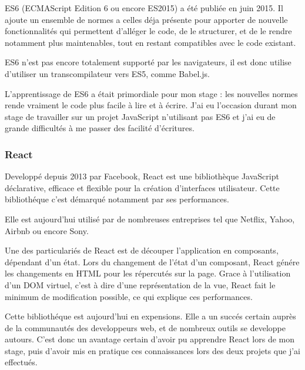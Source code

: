 \documentclass[12pt,a4paper]{article}
\begin{document}
  \bigskip

  ES6 (ECMAScript Edition 6 ou encore ES2015) a été publiée en juin 2015.
  Il ajoute un ensemble de normes a celles déja présente pour apporter de
  nouvelle fonctionnalités qui permettent d'alléger le code, de le
  structurer, et de le rendre notamment plus maintenables, tout en restant
  compatibles avec le code existant.

  \bigskip

  ES6 n'est pas encore totalement supporté par les navigateurs, il est
  donc utilise d'utiliser un transcompilateur vers ES5, comme Babel.js.

  \bigskip

  L'apprentissage de ES6 a était primordiale pour mon stage : les
  nouvelles normes rende vraiment le code plus facile à lire et à écrire.
  J'ai eu l'occasion durant mon stage de travailler sur un projet
  JavaScript n'utilisant pas ES6 et j'ai eu de grande difficultés à me
  passer des facilité d'écritures.

  \bigskip

  \subsubsection{React}\label{react}

  \bigskip

  Developpé depuis 2013 par Facebook, React est une bibliothèque
  JavaScript déclarative, efficace et flexible pour la création
  d'interfaces utilisateur. Cette bibliothéque c'est démarqué notamment
  par ses performances.

  \bigskip

  Elle est aujourd'hui utilisé par de nombreuses entreprises tel que
  Netflix, Yahoo, Airbnb ou encore Sony.

  \bigskip

  Une des particulariés de React est de découper l'application en
  composants, dépendant d'un état. Lors du changement de l'état d'un
  composant, React génére les changements en HTML pour les répercutés sur
  la page. Grace à l'utilisation d'un DOM virtuel, c'est à dire d'une
  représentation de la vue, React fait le minimum de modification
  possible, ce qui explique ces performances.

  \bigskip

  Cette bibliothéque est aujourd'hui en expensions. Elle a un succés
  certain auprès de la communautés des developpeurs web, et de nombreux
  outils se developpe autours. C'est donc un avantage certain d'avoir pu
  apprendre React lors de mon stage, puis d'avoir mis en pratique ces
  connaissances lors des deux projets que j'ai effectués.
\end{document}
